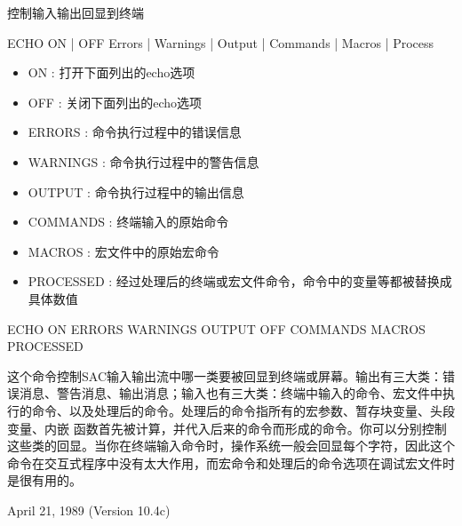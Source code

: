 \label{cmd:echo}
控制输入输出回显到终端

ECHO ON | OFF Errors | Warnings | Output | Commands | Macros | Process

\begin{itemize}
\item ON : 打开下面列出的echo选项
\item OFF : 关闭下面列出的echo选项 
\item ERRORS : 命令执行过程中的错误信息 
\item WARNINGS : 命令执行过程中的警告信息 
\item OUTPUT : 命令执行过程中的输出信息  
\item COMMANDS : 终端输入的原始命令 
\item MACROS : 宏文件中的原始宏命令 
\item PROCESSED : 经过处理后的终端或宏文件命令，命令中的变量等都被替换成具体数值
\end{itemize}

ECHO ON ERRORS WARNINGS OUTPUT OFF COMMANDS MACROS PROCESSED

这个命令控制SAC输入输出流中哪一类要被回显到终端或屏幕。输出有三大类：错误消息、警告消息、输出消息；输入也有三大类：终端中输入的命令、宏文件中执行的命令、以及处理后的命令。处理后的命令指所有的宏参数、暂存块变量、头段变量、内嵌	函数首先被计算，并代入后来的命令而形成的命令。你可以分别控制这些类的回显。当你在终端输入命令时，操作系统一般会回显每个字符，因此这个命令在交互式程序中没有太大作用，而宏命令和处理后的命令选项在调试宏文件时是很有用的。

April 21, 1989 (Version 10.4c)
